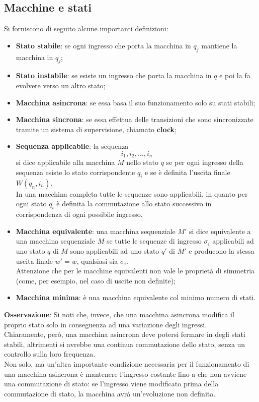 \documentclass[a4paper]{extarticle}
\begin{document}
\subsection{Macchine e stati}
Si forniscono di seguito alcune importanti definizioni:
\begin{itemize}
    \item \textbf{Stato stabile}: se ogni ingresso che porta la macchina in $q_j$ mantiene la macchina in $q_j$;
    \item \textbf{Stato instabile}: se esiste un ingresso che porta la macchina in $q$ e poi la fa evolvere verso un altro stato;
    \item \textbf{Macchina asincrona}: se essa basa il suo funzionamento solo su stati stabili;
    \item \textbf{Macchina sincrona}: se essa effettua delle transizioni che sono sincronizzate tramite un sistema di supervisione, chiamato \textbf{clock};
    \item \textbf{Sequenza applicabile}: la sequenza
    \[i_1,i_2,\dots,i_n\]
    si dice applicabile alla macchina $M$ nello stato $q$ se per ogni ingresso della sequenza esiste lo stato corrispondente $q_i$ e se è definita l'uscita finale $W(q_n,i_n)$.\\
    In una macchina completa tutte le sequenze sono applicabili, in quanto per ogni stato $q_i$ è definita la commutazione allo stato successivo in corrispondenza di ogni possibile ingresso.
    \item \textbf{Macchina equivalente}: una macchina sequenziale $M'$ si dice equivalente a una macchina sequenziale $M$ se tutte le sequenze di ingresso $\sigma_i$ applicabili ad uno stato $q$ di $M$ sono applicabili ad uno stato $q'$ di $M'$ e producono la stessa uscita finale $w' = w$, qualsiasi sia $\sigma_i$.\\
    Attenzione che per le macchine equivalenti non vale le proprietà di simmetria (come, per esempio, nel caso di uscite non definite);
    \item \textbf{Macchina minima}: è una macchina equivalente col minimo numero di stati.
\end{itemize}

\vspace{1em}
\noindent
\textbf{Osservazione}: Si noti che, invece, che una macchina asincrona modifica il proprio stato solo in conseguenza ad una variazione degli ingressi.\\
Chiaramente, però, una macchina asincrona deve potersi fermare in degli stati stabili, altrimenti si avrebbe una continua commutazione dello stato, senza un controllo sulla loro frequenza.\\
Non solo, ma un'altra importante condizione necessaria per il funzionamento di una macchina asincrona è mantenere l'ingresso costante fino a che non avviene una commutazione di stato: se l'ingresso viene modificato prima della commutazione di stato, la macchina avrà un'evoluzione non definita.
\end{document}
